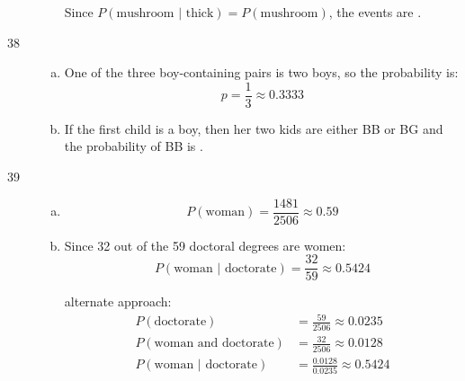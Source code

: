 \documentclass[letterpaper, landscape]{exam}
\begin{document}
\begin{description}
\begin{enumerate}[(a)]
          Since $P(\text{mushroom } | \text{ thick}) = P(\text{mushroom})$,
          the events are .
      \end{enumerate}




    \item[38]
      \begin{enumerate}[(a)]
        \item One of the three boy-containing pairs is two boys, so the
          probability is:
          \[
            p = \frac{1}{3} \approx \boxed{ 0.3333 }
          \]

        \item If the first child is a boy, then her two kids are either BB or
          BG and the probability of BB is .
      \end{enumerate}

    \item[39]
      \begin{enumerate}[(a)]
        \item 
          \[
            P(\text{woman}) = \frac{1481}{2506} \approx \boxed{ 0.59 }
          \]

        \item
          Since 32 out of the 59 doctoral degrees are women:
          \[
            P( \text{woman } | \text { doctorate} ) = \frac{32}{59} 
              \approx \boxed{ 0.5424 }
          \]

          alternate approach:
          \begin{align*}
            P( \text{doctorate} )                   & = \frac{59}{2506} \approx 0.0235 \\
            P( \text{woman and doctorate} )         & = \frac{32}{2506} \approx 0.0128 \\
            P( \text{woman } | \text { doctorate} ) & = \frac{0.0128}{0.0235}
              \approx 0.5424 \\
          \end{align*}


\end{enumerate}
\end{description}
\end{document}
